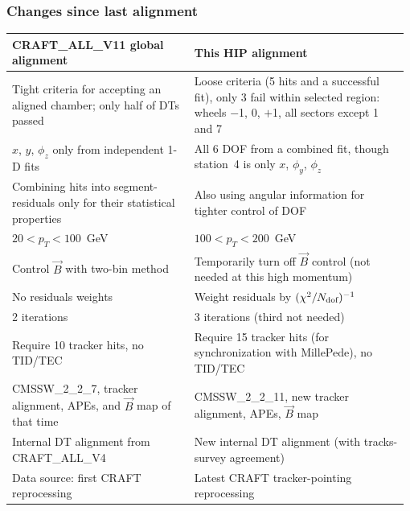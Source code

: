 \documentclass[compress]{beamer}
\begin{document}
\begin{frame}
\frametitle{Changes since last alignment}
\scriptsize

\vspace{0.25 cm}
\renewcommand{\arraystretch}{1.35}\begin{tabular}{p{0.45\linewidth} p{0.53\linewidth}}
CRAFT\_ALL\_V11 global alignment & This HIP alignment \\\hline
Tight criteria for accepting an aligned chamber; only half of DTs passed & Loose criteria (5 hits and a successful fit), only 3 fail within selected region: wheels $-$1, 0, $+$1, all sectors except 1 and 7 \\
$x$, $y$, $\phi_z$ only from independent 1-D fits & All 6 DOF from a combined fit, though station~4 is only $x$, $\phi_y$, $\phi_z$ \\
Combining hits into segment-residuals only for their statistical properties & Also using angular information for tighter control of DOF \\
$20 < p_T < 100$~GeV & $100 < p_T < 200$~GeV \\
Control $\vec{B}$ with two-bin method & Temporarily turn off $\vec{B}$ control (not needed at this high momentum) \\
No residuals weights & Weight residuals by $(\chi^2/N_{\mbox{\scriptsize dof}})^{-1}$ \\
2 iterations & 3 iterations (third not needed) \\
Require 10 tracker hits, no TID/TEC & Require 15 tracker hits (for synchronization with MillePede), no TID/TEC \\
CMSSW\_2\_2\_7, tracker alignment, APEs, and $\vec{B}$ map of that time & CMSSW\_2\_2\_11, new tracker alignment, APEs, $\vec{B}$ map \\
Internal DT alignment from CRAFT\_ALL\_V4 & New internal DT alignment (with tracks-survey agreement) \\
Data source: first CRAFT reprocessing & Latest CRAFT tracker-pointing reprocessing \\
\end{tabular}
\end{frame}
\end{document}
